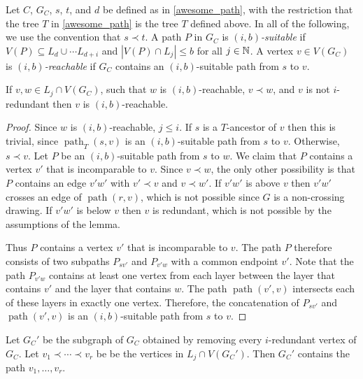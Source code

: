 \documentclass{patmorin}
\newcommand{\defin}[1]{\emph{\textcolor{brightmaroon}{#1}}}
\DeclareMathOperator{\pth}{path}
\begin{document}
Let $C$, $G_C$, $s$, $t$, and $d$ be defined as in \cref{awesome_path}, with the restriction that the tree $T$ in \cref{awesome_path} is the tree $T$ defined above.  In all of the following, we use the convention that $s\prec t$.  A path $P$ in $G_C$ is \defin{$(i,b)$-suitable} if $V(P)\subseteq L_{d}\cup\cdots L_{d+i}$ and $|V(P)\cap L_j|\le b$ for all $j\in\mathbb{N}$.  A vertex $v\in V(G_C)$ is \defin{$(i,b)$-reachable} if $G_C$ contains an $(i,b)$-suitable path from $s$ to $v$.

\begin{clm}
  If $v,w\in L_j\cap V(G_C)$, such that $w$ is $(i,b)$-reachable, $v\prec w$, and $v$ is not $i$-redundant then $v$ is $(i,b)$-reachable.
\end{clm}

\begin{proof}
  Since $w$ is $(i,b)$-reachable, $j\le i$.
  If $s$ is a $T$-ancestor of $v$ then this is trivial, since $\pth_T(s,v)$ is an $(i,b)$-suitable path from $s$ to $v$.  Otherwise, $s\prec v$.
  Let $P$ be an $(i,b)$-suitable path from $s$ to $w$.  We claim that $P$ contains a vertex $v'$ that is incomparable to $v$.  Since $v\prec w$, the only other possibility is that $P$ contains an edge $v'w'$ with $v'\prec v$ and $v\prec w'$. If $v'w'$ is above $v$ then $v'w'$ crosses an edge of $\pth(r,v)$, which is not possible since $G$ is a non-crossing drawing.  If $v'w'$ is below $v$ then $v$ is redundant, which is not possible by the assumptions of the lemma.

  Thus $P$ contains a vertex $v'$ that is incomparable to $v$. The path $P$ therefore consists of two subpaths $P_{sv'}$ and $P_{v'w}$ with a common endpoint $v'$.  Note that the path $P_{v'w}$ contains at least one vertex from each layer between the layer that contains $v'$ and the layer that contains $w$.  The path $\pth(v',v)$ intersects each of these layers in exactly one vertex.  Therefore, the concatenation of $P_{sv'}$ and $\pth(v',v)$ is an $(i,b)$-suitable path from $s$ to $v$.
\end{proof}

\begin{clm}
   Let $G_C'$ be the subgraph of $G_C$ obtained by removing every $i$-redundant vertex of $G_C$.  Let $v_1\prec\cdots\prec v_r$ be be the vertices in $L_j\cap V(G_C')$.  Then $G_C'$ contains the path $v_1,\ldots,v_r$.
\end{clm}
\end{document}
